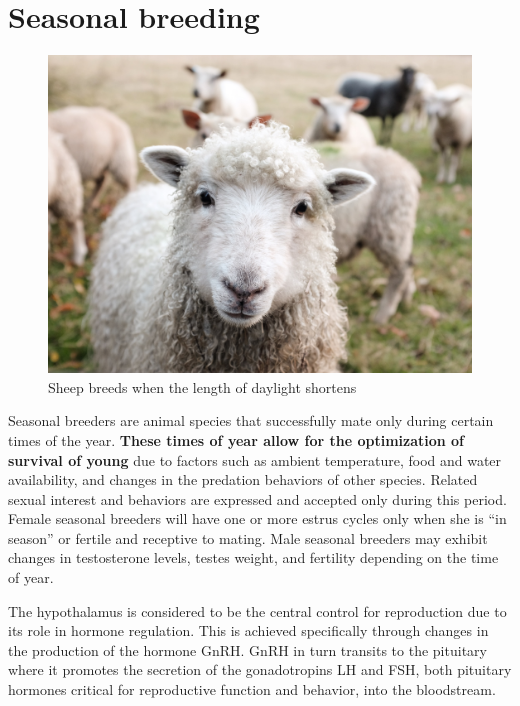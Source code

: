 \documentclass[]{book}
\begin{document}
\section{Seasonal breeding}\label{seasonal-breeding}

\begin{figure}

{\centering \includegraphics[width=1\linewidth]{figures/sheep} 

}

\caption{Sheep breeds when the length of daylight shortens}\label{fig:sheep}
\end{figure}

Seasonal breeders are animal species that successfully mate only during
certain times of the year. \textbf{These times of year allow for the
optimization of survival of young} due to factors such as ambient
temperature, food and water availability, and changes in the predation
behaviors of other species. Related sexual interest and behaviors are
expressed and accepted only during this period. Female seasonal breeders
will have one or more estrus cycles only when she is ``in season'' or
fertile and receptive to mating. Male seasonal breeders may exhibit
changes in testosterone levels, testes weight, and fertility depending
on the time of year.

The hypothalamus is considered to be the central control for
reproduction due to its role in hormone regulation. This is achieved
specifically through changes in the production of the hormone GnRH. GnRH
in turn transits to the pituitary where it promotes the secretion of the
gonadotropins LH and FSH, both pituitary hormones critical for
reproductive function and behavior, into the bloodstream.
\end{document}
